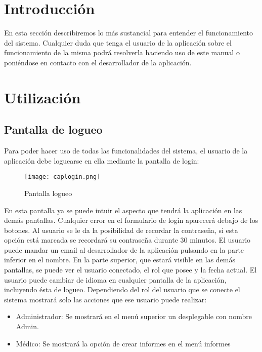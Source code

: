 

\section{Introducción}
En esta sección describiremos lo más sustancial para entender el funcionamiento del sistema. Cualquier duda que tenga el usuario de la aplicación sobre el funcionamiento de la misma podrá resolverla haciendo uso de este manual o poniéndose en contacto con el desarrollador de la aplicación.

\section{Utilización}

\subsection {Pantalla de logueo}
Para poder hacer uso de todas las funcionalidades del sistema, el usuario de la aplicación debe loguearse en ella mediante la pantalla de login:

\begin{figure}[!htb]
  \centering
    \texttt{[image: caplogin.png]}
  \caption{Pantalla logueo}
  \label{a}
\end{figure}

En esta pantalla ya se puede intuir el aspecto que tendrá la aplicación en las demás pantallas. Cualquier error en el formulario de login aparecerá debajo de los botones. Al usuario se le da la posibilidad de recordar la contraseña, si esta opción está marcada se recordará su contraseña durante 30 minutos. El usuario puede mandar un email al desarrollador de la aplicación pulsando en la parte inferior en el nombre. En la parte superior, que estará visible en las demás pantallas, se puede ver el usuario conectado, el rol que posee y la fecha actual. El usuario puede cambiar de idioma en cualquier pantalla de la aplicación, incluyendo ésta de logueo. Dependiendo del rol del usuario que se conecte el sistema mostrará solo las acciones que ese usuario puede realizar:
\begin{itemize}
\item Administrador: Se mostrará en el menú superior un desplegable con nombre Admin.
\item Médico: Se mostrará la opción de crear informes en el menú informes
\end{itemize}

